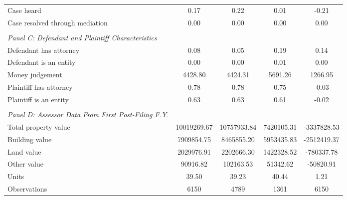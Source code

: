 \begin{table}[htbp]
\begin{tabular}{l*{4}{c}}
\hspace{0.25cm}Case heard&       0.17 &       0.22 &       0.01 &       -0.21\\
\hspace{0.25cm}Case resolved through mediation&       0.00 &       0.00 &       0.00 &        0.00\\
\vspace{0.1em} \\ \emph{Panel C: Defendant and Plaintiff Characteristics}&            &            &            &            \\
\hspace{0.25cm}Defendant has attorney&       0.08 &       0.05 &       0.19 &        0.14\\
\hspace{0.25cm}Defendant is an entity&       0.00 &       0.00 &       0.01 &        0.00\\
\hspace{0.25cm}Money judgement&    4428.80 &    4424.31 &    5691.26 &     1266.95\\
\hspace{0.25cm}Plaintiff has attorney&       0.78 &       0.78 &       0.75 &       -0.03\\
\hspace{0.25cm}Plaintiff is an entity&       0.63 &       0.63 &       0.61 &       -0.02\\
\vspace{0.1em} \\ \emph{Panel D: Assessor Data From First Post-Filing F.Y.}&            &            &            &            \\
\hspace{0.25cm}Total property value&10019269.67 &10757933.84 & 7420105.31 & -3337828.53\\
\hspace{0.25cm}Building value& 7909854.75 & 8465855.20 & 5953435.83 & -2512419.37\\
\hspace{0.25cm}Land value& 2029976.91 & 2202666.30 & 1422328.52 &  -780337.78\\
\hspace{0.25cm}Other value&   90916.82 &  102163.53 &   51342.62 &   -50820.91\\
\hspace{0.25cm}Units&      39.50 &      39.23 &      40.44 &        1.21\\
\midrule
Observations        &        6150&        4789&        1361&        6150\\
\bottomrule
\end{tabular}
\end{table}
